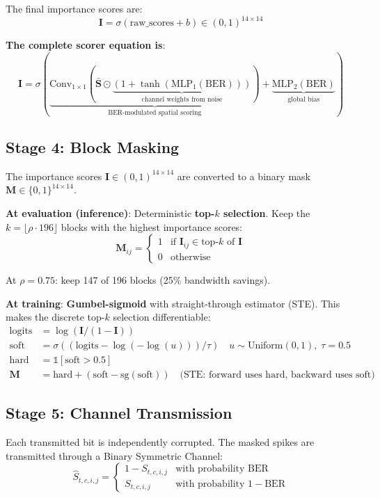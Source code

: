 \documentclass[11pt]{article}
\begin{document}
The final importance scores are:
\[
\mathbf{I} = \sigma(\text{raw\_scores} + b) \in (0, 1)^{14 \times 14}
\]

\textbf{The complete scorer equation is}:
\[
\boxed{
\mathbf{I} = \sigma\!\left( 
    \underbrace{\text{Conv}_{1{\times}1}\!\left( 
        \bar{\mathbf{S}} \odot \underbrace{(1 + \tanh(\text{MLP}_1(\text{BER})))}_{\text{channel weights from noise}}
    \right)}_{\text{BER-modulated spatial scoring}} 
    + \underbrace{\text{MLP}_2(\text{BER})}_{\text{global bias}}
\right)
}
\]

\subsection{Stage 4: Block Masking}

The importance scores $\mathbf{I} \in (0,1)^{14 \times 14}$ are converted to a binary mask $\mathbf{M} \in \{0,1\}^{14 \times 14}$.

\textbf{At evaluation (inference)}: Deterministic \textbf{top-$k$ selection}. Keep the $k = \lfloor \rho \cdot 196 \rfloor$ blocks with the highest importance scores:
\[
\mathbf{M}_{ij} = \begin{cases} 1 & \text{if } \mathbf{I}_{ij} \in \text{top-}k\text{ of } \mathbf{I} \\ 0 & \text{otherwise} \end{cases}
\]

At $\rho{=}0.75$: keep 147 of 196 blocks (25\% bandwidth savings).

\textbf{At training}: \textbf{Gumbel-sigmoid} with straight-through estimator (STE). This makes the discrete top-$k$ selection differentiable:
\begin{align}
    \text{logits} &= \log(\mathbf{I} / (1 - \mathbf{I})) \\
    \text{soft} &= \sigma((\text{logits} - \log(-\log(u))) / \tau) \quad u \sim \text{Uniform}(0,1),\; \tau{=}0.5 \\
    \text{hard} &= \mathbb{1}[\text{soft} > 0.5] \\
    \mathbf{M} &= \text{hard} + (\text{soft} - \text{sg}(\text{soft})) \quad \text{(STE: forward uses hard, backward uses soft)}
\end{align}

\subsection{Stage 5: Channel Transmission}

Each transmitted bit is independently corrupted. The masked spikes are transmitted through a Binary Symmetric Channel:
\[
\hat{S}_{t,c,i,j} = \begin{cases}
    1 - S_{t,c,i,j} & \text{with probability BER} \\
    S_{t,c,i,j} & \text{with probability } 1 - \text{BER}
\end{cases}
\]
\end{document}
